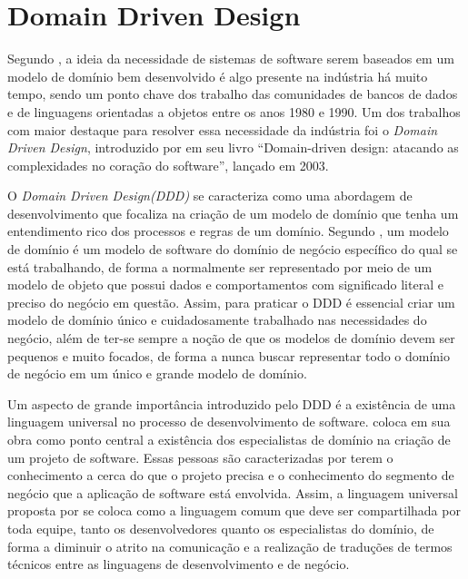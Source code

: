 \documentclass[12pt, %
openright, 
oneside, %
a4paper,    %
brazil]{facom-ufu-abntex2}
\begin{document}
\section{Domain Driven Design}
Segundo , a ideia da necessidade de sistemas de software serem baseados em um modelo de domínio bem desenvolvido é algo presente na indústria há muito tempo, sendo um ponto chave dos trabalho das comunidades de bancos de dados e de linguagens orientadas a objetos entre os anos 1980 e 1990. Um dos trabalhos com maior destaque para resolver essa necessidade da indústria foi o \textit{Domain Driven Design}, introduzido por  em seu livro ``Domain-driven design: atacando as complexidades no coração do software'', lançado em 2003.

O \textit{Domain Driven Design(DDD)} se caracteriza como uma abordagem de desenvolvimento que focaliza na criação de um modelo de domínio que tenha um entendimento rico dos processos e regras de um domínio. Segundo , um modelo de domínio é um modelo de software do domínio de negócio específico do qual se está trabalhando, de forma a normalmente ser representado por meio de um modelo de objeto que possui dados e comportamentos com significado literal e preciso do negócio em questão. Assim, para praticar o DDD é essencial criar um modelo de domínio único e cuidadosamente trabalhado nas necessidades do negócio, além de ter-se sempre a noção de que os modelos de domínio devem ser pequenos e muito focados, de forma a nunca buscar representar todo o domínio de negócio em um único e grande modelo de domínio.

Um aspecto de grande importância introduzido pelo DDD é a existência de uma linguagem universal no processo de desenvolvimento de software.  coloca em sua obra como ponto central a existência dos especialistas de domínio na criação de um projeto de software. Essas pessoas são caracterizadas por terem o conhecimento a cerca do que o projeto precisa e o conhecimento do segmento de negócio que a aplicação de software está envolvida. Assim, a linguagem universal proposta por  se coloca como a linguagem comum que deve ser compartilhada por toda equipe, tanto os desenvolvedores quanto os especialistas do domínio, de forma a diminuir o atrito na comunicação e a realização de traduções de termos técnicos entre as linguagens de desenvolvimento e de negócio.
\end{document}

